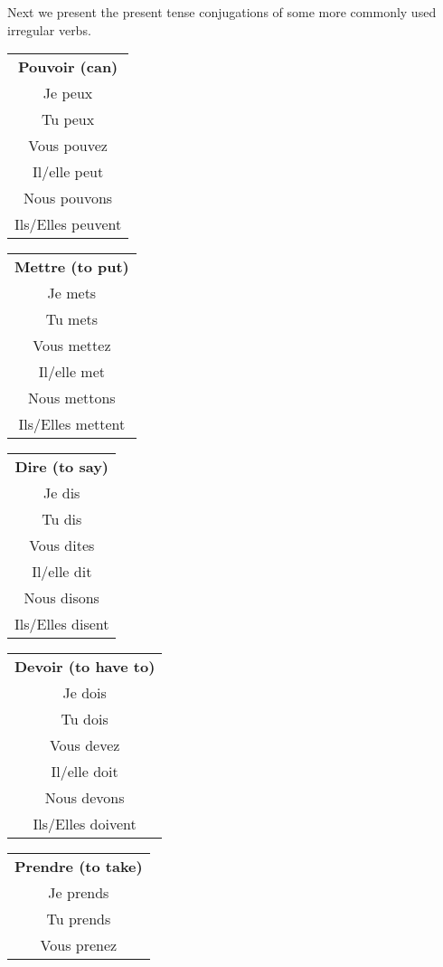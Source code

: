 \documentclass[12pt]{article}
\theoremstyle{plain}
\theoremstyle{definition}
\begin{document}
	Next we present the present tense conjugations of some more commonly used irregular verbs.
	\begin{center}
		\begin{tabular}{|c|}
			\hline
			\textbf{Pouvoir (can)}\\
			Je peux\\
			Tu peux\\
			Vous pouvez\\
			Il/elle peut\\
			Nous pouvons\\
			Ils/Elles peuvent\\
			\hline
		\end{tabular}
		\begin{tabular}{|c|}
			\hline
			\textbf{Mettre (to put)}\\
			Je mets\\
			Tu mets\\
			Vous mettez\\
			Il/elle met\\
			Nous mettons\\
			Ils/Elles mettent\\
			\hline
		\end{tabular}
		\begin{tabular}{|c|}
			\hline
			\textbf{Dire (to say)}\\
			Je dis\\
			Tu dis\\
			Vous dites\\
			Il/elle dit\\
			Nous disons\\
			Ils/Elles disent\\
			\hline
		\end{tabular}
	\begin{tabular}{|c|}
		\hline
		\textbf{Devoir (to have to)}\\
		Je dois\\
		Tu dois\\
		Vous devez\\
		Il/elle doit\\
		Nous devons\\
		Ils/Elles doivent\\
		\hline
	\end{tabular}
%
\begin{tabular}{|c|}
	\hline
	\textbf{Prendre (to take)}\\
	Je prends\\
	Tu prends\\
	Vous prenez\\

\end{tabular}
\end{center}
\end{document}
